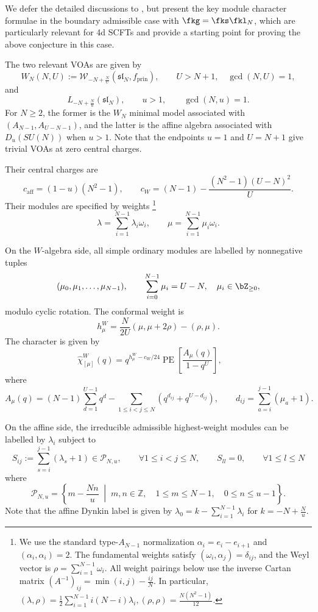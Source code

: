 \documentclass[a4paper,11pt]{article}
\theoremstyle{definition}
\theoremstyle{definition}
\theoremstyle{remark}
\newcommand{\be}{\begin{equation}}
\newcommand{\ee}{\end{equation}}
\begin{document}
 
 

We defer the detailed discussions to \cite{Jiang20272}, but present the key module character formulae in the boundary admissible case with  $\fkg=\fks\fkl_N$, which are particularly relevant for 4d SCFTs and provide a starting point for proving the above conjecture in this case. 

 The two relevant VOAs are given by
\be
W_N(N,U):=\mathcal W_{-N+\frac N U}(\mathfrak{sl}_N,f_{\mathrm{prin}}), \qquad U>N+1, \quad \gcd(N,U)=1,
\ee
and
\be
L_{-N+\frac Nu}(\mathfrak{sl}_N), \qquad u> 1,\qquad \gcd(N,u)=1.
\ee
 For $N\ge2$, the former is the $W_N$ minimal model associated with $(A_{N-1},A_{U-N-1})$, and the latter is the affine algebra associated with $D_u(SU(N))$ when $u>1$. Note that the endpoints $u=1$ and $U=N+1$ give    trivial VOAs at  zero central charges. 

 Their central charges   are
\be
c_{\mathrm{aff}}  = (1 - u)(N^2 - 1), \qquad c _W= (N - 1) - \frac{(N^2 - 1)(U - N)^2}{U}.
\ee
Their modules are specified by   weights 
\footnote{We use the standard type-$A_{N-1}$ normalization
$\alpha_i=e_i-e_{i+1}$ and $(\alpha_i,\alpha_i)=2$.
The fundamental weights satisfy $(\omega_i,\alpha_j)=\delta_{ij}$, and the Weyl vector is
$
\rho 
=\sum_{i=1}^{N-1}\omega_i 
$.
All weight pairings below use the inverse Cartan matrix $(A^{-1})_{ij}=\min(i,j) - \frac{ij}{N}$. In particular,
$
(\lambda,\rho)=\frac12\sum_{i=1}^{N-1}i(N-i)\lambda_i,
  (\rho,\rho)=\frac{N(N^2-1)}{12} 
$. } 
\be \label{almbdamu}
\lambda=\sum_{i=1}^{N-1}\lambda_i\omega_i,
\qquad
\mu=\sum_{i=1}^{N-1}\mu_i\omega_i.
\ee
 
 On the $W$-algebra side, all simple ordinary   modules are labelled by nonnegative tuples
\be 
(\mu_0, \mu_1, \dots, \mu_{N-1}), \qquad \sum _{i=0}^{N-1}  \mu_i = U - N, \quad \mu_i \in \bZ_{\ge 0},
\ee
 modulo cyclic rotation. The conformal weight is 
 \be
 h^W_\mu = \frac{N}{2U}(\mu, \mu + 2\rho) - (\rho, \mu).
 \ee
 The character is given by 
\be  \label{Wmdch}
\widehat\chi^W_{[\mu]}(q) = q^{h^W_\mu - c_W/24} \operatorname{PE} \left[ \frac{A_\mu(q)}{1 - q^U} \right],
 \qquad
\ee
where 
\be  
A_\mu(q) = (N - 1) \sum_{d=1}^{U-1} q^d - \sum_{1\le i < j \le N } \left(q^{d_{ij}} + q^{U-d_{ij}}\right), \qquad
d_{ij} =  \sum_{a=i}^{j-1} (\mu_a + 1).   
\ee


 On the affine side, the irreducible   admissible highest-weight modules can be labelled by $\lambda_i$ subject to 
\be\label{lambdai}
S_{ij} %
:=\sum_{s=i}^{j-1}(\lambda_s+1)\in\mathcal P_{N,u},
\qquad  \forall 1\le i<j\le N,\qquad S_{ll}=0,\qquad  \forall 1\le l \le N
\ee
where
\be\label{eq:typeA-allowed-pairings}
\mathcal P_{N,u}
=\left\{m-\frac{Nn}{u}\;\middle|\;
m,n\in\mathbb Z,\quad 1\le m\le N-1,\quad 0\le n\le u-1\right\}.
\ee
 Note that the  affine Dynkin label   is given by $\lambda_0=k -\sum_{i=1}^{N-1} \lambda_i$ for $k =-N+\frac Nu$.
\end{document}
